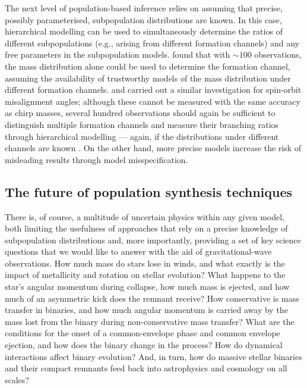 \documentclass[review]{elsarticle}
\begin{document}
The next level of population-based inference relies on assuming that precise, possibly parameterised, subpopulation distributions are known.  In this case, hierarchical modelling \citep[extreme deconvolution in the language of][]{Hogg:2010} can be used to simultaneously determine the ratios of different subpopulations (e.g., arising from different formation channels) and any free parameters in the subpopulation models.  \citet{Zevin:2017} found that with $\sim 100$ observations, the mass distribution alone could be used to determine the formation channel, assuming the availability of trustworthy models of the mass distribution under different formation channels.  \citet{Vitale:2015} and \citet{Stevenson:2017spin} carried out a similar investigation for spin-orbit misalignment angles; although these cannot be measured with the same accuracy as chirp masses, several hundred observations should again be sufficient to distinguish multiple formation channels and measure their branching ratios through hierarchical modelling --- again, if the distributions under different channels are known \citep{Stevenson:2017spin}.   On the other hand, more precise models increase the risk of misleading results through model misspecification.

\subsection{The future of population synthesis techniques}
There is, of course, a multitude of uncertain physics within any given model, both limiting the usefulness of approaches that rely on a precise knowledge of subpopulation distributions and, more importantly, providing a set of key science questions that we would like to answer with the aid of gravitational-wave observations.  How much mass do stars lose in winds, and what exactly is the impact of metallicity and rotation on stellar evolution?  What happens to the star's angular momentum during collapse, how much mass is ejected, and how much of an asymmetric kick does the remnant receive? How conservative is mass transfer in binaries, and how much angular momentum is carried away by the mass lost from the binary during non-conservative mass transfer?  What are the conditions for the onset of a common-envelope phase and common envelope ejection, and how does the binary change in the process?   How do dynamical interactions affect binary evolution?  And, in turn, how do massive stellar binaries and their compact remnants feed back into astrophysics and cosmology on all scales?
\end{document}

